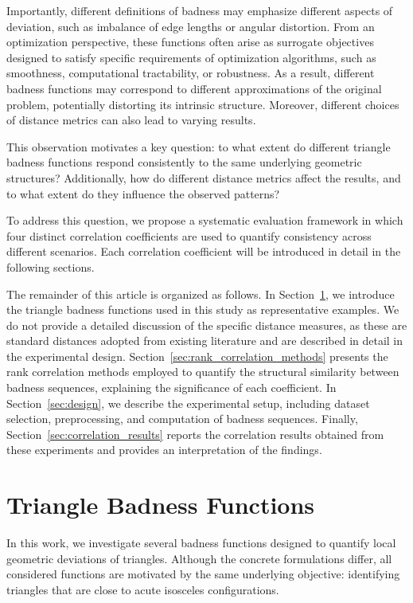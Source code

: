 \documentclass[11pt]{article}
\begin{document}
Importantly, different definitions of badness may emphasize different aspects of deviation, such as imbalance of edge lengths or angular distortion. From an optimization perspective, these functions often arise as surrogate objectives designed to satisfy specific requirements of optimization algorithms, such as smoothness, computational tractability, or robustness. As a result, different badness functions may correspond to different approximations of the original problem, potentially distorting its intrinsic structure. Moreover, different choices of distance metrics can also lead to varying results.

This observation motivates a key question: to what extent do different triangle badness functions respond consistently to the same underlying geometric structures? Additionally, how do different distance metrics affect the results, and to what extent do they influence the observed patterns?

To address this question, we propose a systematic evaluation framework in which four distinct correlation coefficients are used to quantify consistency across different scenarios. Each correlation coefficient will be introduced in detail in the following sections.  

The remainder of this article is organized as follows. In Section~\ref{sec:traingle}, we introduce the triangle badness functions used in this study as representative examples. We do not provide a detailed discussion of the specific distance measures, as these are standard distances adopted from existing literature and are described in detail in the experimental design. Section~\ref{sec:rank_correlation_methods} presents the rank correlation methods employed to quantify the structural similarity between badness sequences, explaining the significance of each coefficient. In Section~\ref{sec:design}, we describe the experimental setup, including dataset selection, preprocessing, and computation of badness sequences. Finally, Section~\ref{sec:correlation_results} reports the correlation results obtained from these experiments and provides an interpretation of the findings.


\section{Triangle Badness Functions}\label{sec:traingle}

In this work, we investigate several badness functions designed to quantify local geometric deviations of triangles. Although the concrete formulations differ, all considered functions are motivated by the same underlying objective: identifying triangles that are close to acute isosceles configurations.
\end{document}
